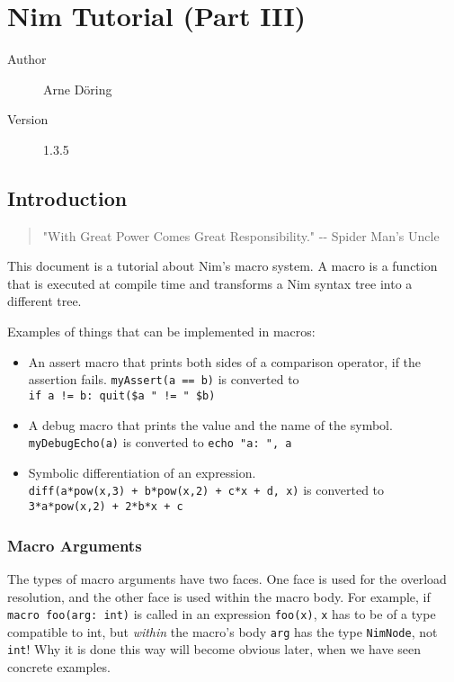\hypertarget{nim-tutorial-part-iii}{%
\section{Nim Tutorial (Part III)}\label{nim-tutorial-part-iii}}

\begin{description}
\item[Author]
Arne Döring
\item[Version]
1.3.5
\end{description}

\hypertarget{introduction}{%
\subsection{Introduction}\label{introduction}}

\begin{quote}
"With Great Power Comes Great Responsibility." -\/- Spider Man's Uncle
\end{quote}

This document is a tutorial about Nim's macro system. A macro is a
function that is executed at compile time and transforms a Nim syntax
tree into a different tree.

Examples of things that can be implemented in macros:

\begin{itemize}
\tightlist
\item
  An assert macro that prints both sides of a comparison operator, if
  the assertion fails. \texttt{myAssert(a\ ==\ b)} is converted to
  \texttt{if\ a\ !=\ b:\ quit(\$a\ "\ !=\ "\ \$b)}
\item
  A debug macro that prints the value and the name of the symbol.
  \texttt{myDebugEcho(a)} is converted to \texttt{echo\ "a:\ ",\ a}
\item
  Symbolic differentiation of an expression.
  \texttt{diff(a*pow(x,3)\ +\ b*pow(x,2)\ +\ c*x\ +\ d,\ x)} is
  converted to \texttt{3*a*pow(x,2)\ +\ 2*b*x\ +\ c}
\end{itemize}

\hypertarget{macro-arguments}{%
\subsubsection{Macro Arguments}\label{macro-arguments}}

The types of macro arguments have two faces. One face is used for the
overload resolution, and the other face is used within the macro body.
For example, if \texttt{macro\ foo(arg:\ int)} is called in an
expression \texttt{foo(x)}, \texttt{x} has to be of a type compatible to
int, but \emph{within} the macro's body \texttt{arg} has the type
\texttt{NimNode}, not \texttt{int}! Why it is done this way will become
obvious later, when we have seen concrete examples.

